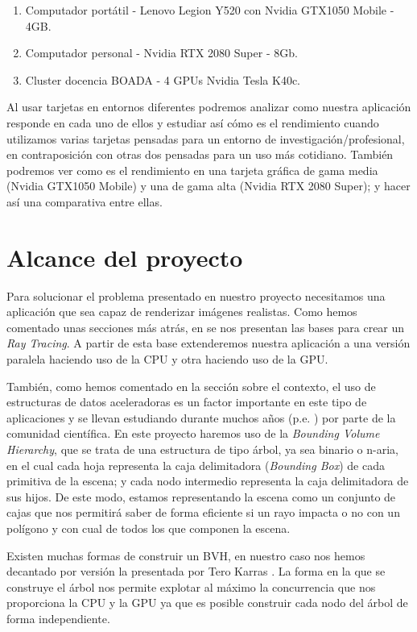 \documentclass[titlepage,12pt]{report}
\begin{document}
\begin{enumerate}
	\item Computador portátil - Lenovo Legion Y520 con Nvidia GTX1050 Mobile - 4GB.
	\item Computador personal - Nvidia RTX 2080 Super - 8Gb.
	\item Cluster docencia BOADA - 4 GPUs Nvidia Tesla K40c.
\end{enumerate}

Al usar tarjetas en entornos diferentes podremos analizar como nuestra aplicación responde en cada uno de ellos y estudiar así cómo es el rendimiento cuando utilizamos varias tarjetas pensadas para un entorno de investigación/profesional, en contraposición con otras dos pensadas para un uso más cotidiano. También podremos ver como es el rendimiento en una tarjeta gráfica de gama media (Nvidia GTX1050 Mobile) y una de gama alta (Nvidia RTX 2080 Super); y hacer así una comparativa entre ellas.

\section{Alcance del proyecto}

Para solucionar el problema presentado en nuestro proyecto necesitamos una aplicación que sea capaz de renderizar imágenes realistas. Como hemos comentado unas secciones más atrás, en \cite{Shirley2018a, Shirley2018b, Shirley2018c} se nos presentan las bases para crear un \textit{Ray Tracing}. A partir de esta base extenderemos nuestra aplicación a una versión paralela haciendo uso de la CPU y otra haciendo uso de la GPU.

También, como hemos comentado en la sección sobre el contexto, el uso de estructuras de datos aceleradoras es un factor importante en este tipo de aplicaciones y se llevan estudiando durante muchos años (p.e. \cite{Rubin1980}) por parte de la comunidad científica. En este proyecto haremos uso de la \textit{Bounding Volume Hierarchy}, que se trata de una estructura de tipo árbol, ya sea binario o n-aria, en el cual cada hoja representa la caja delimitadora (\textit{Bounding Box}) de cada primitiva de la escena; y cada nodo intermedio representa la caja delimitadora de sus hijos. De este modo, estamos representando la escena como un conjunto de cajas que nos permitirá saber de forma eficiente si un rayo impacta o no con un polígono y con cual de todos los que componen la escena.

Existen muchas formas de construir un BVH, en nuestro caso nos hemos decantado por versión la presentada por Tero Karras \cite{Karras2012, Karras2013}. La forma en la que se construye el árbol nos permite explotar al máximo la concurrencia que nos proporciona la CPU y la GPU ya que es posible construir cada nodo del árbol de forma independiente. 
\end{document}
